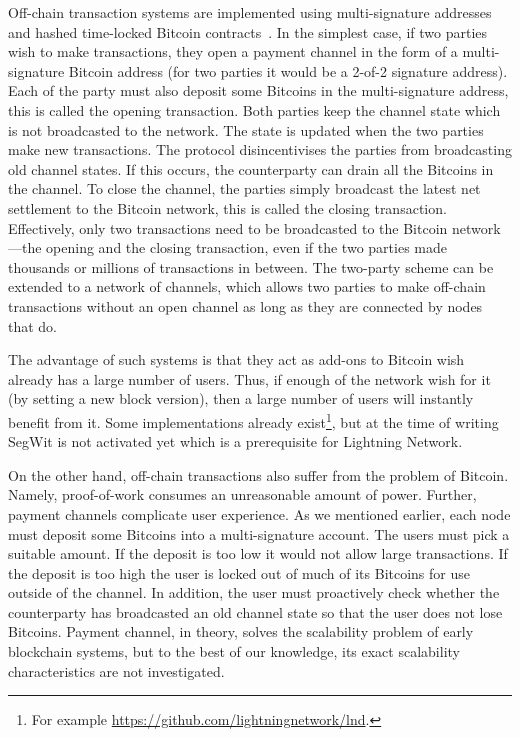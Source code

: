 Off-chain transaction systems are implemented using multi-signature addresses~\cite{bitcoinmultisig} and hashed time-locked Bitcoin contracts~\cite{bitcointimelock}.
In the simplest case, 
if two parties wish to make transactions,
they open a payment channel in the form of a multi-signature Bitcoin address (for two parties it would be a 2-of-2 signature address).
Each of the party must also deposit some Bitcoins in the multi-signature address,
this is called the opening transaction.
Both parties keep the channel state which is not broadcasted to the network.
The state is updated when the two parties make new transactions.
The protocol disincentivises the parties from broadcasting old channel states.
If this occurs, the counterparty can drain all the Bitcoins in the channel.
To close the channel, the parties simply broadcast the latest net settlement to the Bitcoin network,
this is called the closing transaction.
Effectively, only two transactions need to be broadcasted to the Bitcoin network---the opening and the closing transaction,
even if the two parties made thousands or millions of transactions in between.
The two-party scheme can be extended to a network of channels,
which allows two parties to make off-chain transactions without an open channel as long as they are connected by nodes that do.

The advantage of such systems is that they act as add-ons to Bitcoin wish already has a large number of users.
Thus, if enough of the network wish for it (by setting a new block version),
then a large number of users will instantly benefit from it.
Some implementations already exist\footnote{For example \url{https://github.com/lightningnetwork/lnd}.},
but at the time of writing SegWit is not activated yet which is a prerequisite for Lightning Network.

On the other hand, off-chain transactions also suffer from the problem of Bitcoin.
Namely, proof-of-work consumes an unreasonable amount of power.
Further, payment channels complicate user experience.
As we mentioned earlier, each node must deposit some Bitcoins into a multi-signature account.
The users must pick a suitable amount.
If the deposit is too low it would not allow large transactions.
If the deposit is too high the user is locked out of much of its Bitcoins for use outside of the channel.
In addition, the user must proactively check whether the counterparty has broadcasted an old channel state so that the user does not lose Bitcoins.
Payment channel, in theory, solves the scalability problem of early blockchain systems,
but to the best of our knowledge, its exact scalability characteristics are not investigated.

